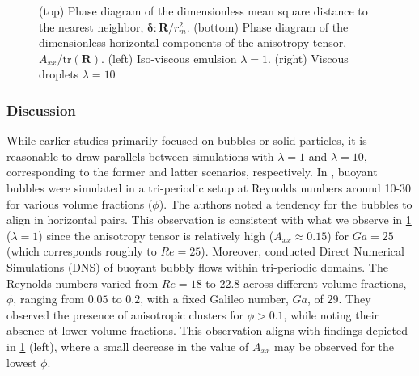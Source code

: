 \documentclass[11pt]{My_preprint}
\providecommand{\DIFaddendFL}{} %
\begin{document}
\begin{figure}[h!]
    \DIFaddendFL \caption{
        (top) Phase diagram of the dimensionless mean square distance to the nearest neighbor, $\bm\delta:\textbf{R}/r_m^2$.
        (bottom) Phase diagram of the dimensionless horizontal components of the anisotropy tensor, $A_{xx}/\text{tr}(\textbf{R})$.  
        (left) Iso-viscous emulsion $\lambda = 1$.
        (right) Viscous droplets $\lambda = 10$ }
    \label{fig:phase}
\end{figure}

\subsubsection*{Discussion}
While earlier studies primarily focused on bubbles or solid particles, it is reasonable to draw parallels between simulations with $\lambda = 1$ and $\lambda = 10$, corresponding to the former and latter scenarios, respectively. In \citet{bunner2002dynamics}, buoyant bubbles were simulated in a tri-periodic setup at Reynolds numbers around 10-30 for various volume fractions ($\phi$). The authors noted a tendency for the bubbles to align in horizontal pairs. This observation is consistent with what we observe in \ref{fig:phase} ($\lambda = 1$) since the anisotropy tensor is relatively high ($A_{xx} \approx 0.15$) for $Ga = 25$ (which corresponds roughly to $Re = 25$). 
Moreover, \citet{zhang2021direct} conducted Direct Numerical Simulations (DNS) of buoyant bubbly flows within tri-periodic domains. The Reynolds numbers varied from $Re=18$ to $22.8$ across different volume fractions, $\phi$, ranging from $0.05$ to $0.2$, with a fixed Galileo number, $Ga$, of $29$. They observed the presence of anisotropic clusters for $\phi > 0.1$, while noting their absence at lower volume fractions. This observation aligns with findings depicted in \ref{fig:phase} (left), where a small decrease in the value of $A_{xx}$ may be observed for the lowest $\phi$.
\end{document}
